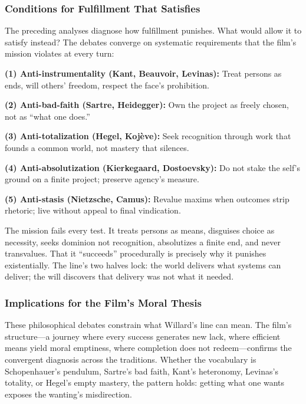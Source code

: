 \subsubsection*{Conditions for Fulfillment That Satisfies}

The preceding analyses diagnose how fulfillment punishes. What would allow it to satisfy
instead? The debates converge on systematic requirements that the film's mission violates at
every turn:

\textbf{(1) Anti-instrumentality (Kant, Beauvoir, Levinas):} Treat persons as ends, will
others' freedom, respect the face's prohibition.

\textbf{(2) Anti-bad-faith (Sartre, Heidegger):} Own the project as freely chosen, not as
``what one does.''

\textbf{(3) Anti-totalization (Hegel, Kojève):} Seek recognition through work that founds a
common world, not mastery that silences.

\textbf{(4) Anti-absolutization (Kierkegaard, Dostoevsky):} Do not stake the self's ground on
a finite project; preserve agency's measure.

\textbf{(5) Anti-stasis (Nietzsche, Camus):} Revalue maxims when outcomes strip rhetoric; live
without appeal to final vindication.

The mission fails every test. It treats persons as means, disguises choice as necessity, seeks
dominion not recognition, absolutizes a finite end, and never transvalues. That it
``succeeds'' procedurally is precisely why it punishes existentially. The line's two halves
lock: the world delivers what systems can deliver; the will discovers that delivery was not
what it needed.

\subsubsection*{Implications for the Film's Moral Thesis}

These philosophical debates constrain what Willard's line can mean. The film's structure---a
journey where every success generates new lack, where efficient means yield moral emptiness,
where completion does not redeem---confirms the convergent diagnosis across the traditions.
Whether the vocabulary is Schopenhauer's pendulum, Sartre's bad faith, Kant's heteronomy,
Levinas's totality, or Hegel's empty mastery, the pattern holds: getting what one wants
exposes the wanting's misdirection.

